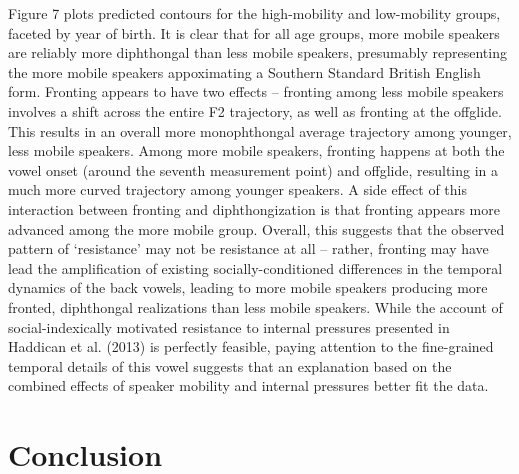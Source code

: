 \documentclass[12pt]{article}
\begin{document}
Figure 7 plots predicted contours for the high-mobility and low-mobility groups, faceted by year of birth. It is clear that for all age groups, more mobile speakers are reliably more diphthongal than less mobile speakers, presumably representing the more mobile speakers appoximating a Southern Standard British English form. Fronting appears to have two effects -- fronting among less mobile speakers involves a shift across the entire F2 trajectory, as well as fronting at the offglide. This results in an overall more monophthongal average trajectory among younger, less mobile speakers. Among more mobile speakers, fronting happens at both the vowel onset (around the seventh measurement point) and offglide, resulting in a much more curved trajectory among younger speakers. A side effect of this interaction between fronting and diphthongization is that fronting appears more advanced among the more mobile group. Overall, this suggests that the observed pattern of `resistance' may not be resistance at all -- rather, fronting may have lead the amplification of existing socially-conditioned differences in the temporal dynamics of the back vowels, leading to more mobile speakers producing more fronted, diphthongal realizations than less mobile speakers. While the account of social-indexically motivated resistance to internal pressures presented in Haddican et al. (2013) is perfectly feasible, paying attention to the fine-grained temporal details of this vowel suggests that an explanation based on the combined effects of speaker mobility and internal pressures better fit the data.

\section{Conclusion}
\end{document}
